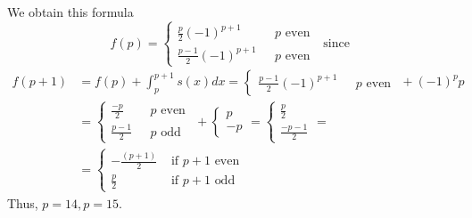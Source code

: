 \documentclass[twoside]{amsart}
\theoremstyle{plain}
\theoremstyle{definition}
\begin{document}
We obtain this formula
\[
f(p) = \begin{cases} \frac{p}{2} (-1)^{p+1} & \text{ $p$ even } \\
  \frac{ p-1}{2} (-1)^{p+1} & \text{ $p$ even } \end{cases} \text{ since }
\]
\[
\begin{aligned}
  f(p+1) & = f(p) + \int_p^{p+1} s(x) dx =  \begin{cases} \frac{ p-1}{2} (-1)^{p+1} & \text{ $p$ even } \end{cases} + (-1)^p p \\
  & = \begin{cases} \frac{ -p}{2} & \text{ $p$ even } \\ \frac{ p-1}{2} & \text{ $p$ odd } \end{cases} + \begin{cases} p \\ -p \end{cases} = \begin{cases} \frac{p}{2} \\ \frac{ -p-1}{2} \end{cases} = \\
  & = \begin{cases} - \frac{ (p+1)}{2} & \text{ if $p+1$ even }  \\ \frac{p}{2} & \text{ if $p+1$ odd } \end{cases}
\end{aligned}
\]
Thus, $p=14, p=15$.  
\end{document}
